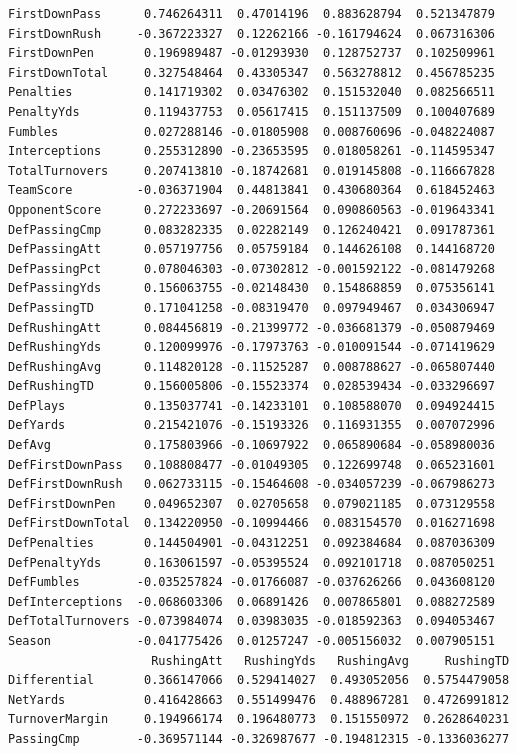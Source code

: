 \documentclass[
  letterpaper,
  DIV=11,
  numbers=noendperiod]{scrreprt}
\begin{document}
\begin{verbatim}
FirstDownPass      0.746264311  0.47014196  0.883628794  0.521347879
FirstDownRush     -0.367223327  0.12262166 -0.161794624  0.067316306
FirstDownPen       0.196989487 -0.01293930  0.128752737  0.102509961
FirstDownTotal     0.327548464  0.43305347  0.563278812  0.456785235
Penalties          0.141719302  0.03476302  0.151532040  0.082566511
PenaltyYds         0.119437753  0.05617415  0.151137509  0.100407689
Fumbles            0.027288146 -0.01805908  0.008760696 -0.048224087
Interceptions      0.255312890 -0.23653595  0.018058261 -0.114595347
TotalTurnovers     0.207413810 -0.18742681  0.019145808 -0.116667828
TeamScore         -0.036371904  0.44813841  0.430680364  0.618452463
OpponentScore      0.272233697 -0.20691564  0.090860563 -0.019643341
DefPassingCmp      0.083282335  0.02282149  0.126240421  0.091787361
DefPassingAtt      0.057197756  0.05759184  0.144626108  0.144168720
DefPassingPct      0.078046303 -0.07302812 -0.001592122 -0.081479268
DefPassingYds      0.156063755 -0.02148430  0.154868859  0.075356141
DefPassingTD       0.171041258 -0.08319470  0.097949467  0.034306947
DefRushingAtt      0.084456819 -0.21399772 -0.036681379 -0.050879469
DefRushingYds      0.120099976 -0.17973763 -0.010091544 -0.071419629
DefRushingAvg      0.114820128 -0.11525287  0.008788627 -0.065807440
DefRushingTD       0.156005806 -0.15523374  0.028539434 -0.033296697
DefPlays           0.135037741 -0.14233101  0.108588070  0.094924415
DefYards           0.215421076 -0.15193326  0.116931355  0.007072996
DefAvg             0.175803966 -0.10697922  0.065890684 -0.058980036
DefFirstDownPass   0.108808477 -0.01049305  0.122699748  0.065231601
DefFirstDownRush   0.062733115 -0.15464608 -0.034057239 -0.067986273
DefFirstDownPen    0.049652307  0.02705658  0.079021185  0.073129558
DefFirstDownTotal  0.134220950 -0.10994466  0.083154570  0.016271698
DefPenalties       0.144504901 -0.04312251  0.092384684  0.087036309
DefPenaltyYds      0.163061597 -0.05395524  0.092101718  0.087050251
DefFumbles        -0.035257824 -0.01766087 -0.037626266  0.043608120
DefInterceptions  -0.068603306  0.06891426  0.007865801  0.088272589
DefTotalTurnovers -0.073984074  0.03983035 -0.018592363  0.094053467
Season            -0.041775426  0.01257247 -0.005156032  0.007905151
                    RushingAtt   RushingYds   RushingAvg     RushingTD
Differential       0.366147066  0.529414027  0.493052056  0.5754479058
NetYards           0.416428663  0.551499476  0.488967281  0.4726991812
TurnoverMargin     0.194966174  0.196480773  0.151550972  0.2628640231
PassingCmp        -0.369571144 -0.326987677 -0.194812315 -0.1336036277

\end{verbatim}
\end{document}

